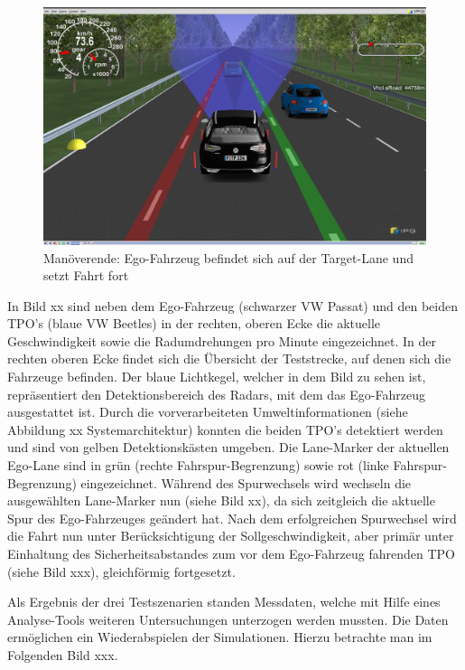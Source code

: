\begin{figure}[!ht]
	\begin{center}
		\includegraphics[width=1.0\linewidth]{Abbildungen/bericht/carmaker_lc_part3}
		\caption{Manöverende: Ego-Fahrzeug befindet sich auf der Target-Lane und setzt Fahrt fort}
		\label{fig.carmaker_lanechange_part3}
	\end{center}
\end{figure} 

In Bild xx sind neben dem Ego-Fahrzeug (schwarzer VW Passat) und den beiden TPO's (blaue VW Beetles) in der rechten, oberen Ecke die aktuelle Geschwindigkeit sowie die Radumdrehungen pro Minute eingezeichnet. In der rechten oberen Ecke findet sich die Übersicht der Teststrecke, auf denen sich die Fahrzeuge befinden. Der blaue Lichtkegel, welcher in dem Bild zu sehen ist, repräsentiert den Detektionsbereich des Radars, mit dem das Ego-Fahrzeug ausgestattet ist. Durch die vorverarbeiteten Umweltinformationen (siehe Abbildung xx Systemarchitektur) konnten die beiden TPO's detektiert werden und sind von gelben Detektionskästen umgeben. Die Lane-Marker der aktuellen Ego-Lane sind in grün (rechte Fahrspur-Begrenzung) sowie rot (linke Fahrspur-Begrenzung) eingezeichnet. Während des Spurwechsels wird wechseln die ausgewählten Lane-Marker nun (siehe Bild xx), da sich zeitgleich die aktuelle Spur des Ego-Fahrzeuges geändert hat. Nach dem erfolgreichen Spurwechsel wird die Fahrt nun unter Berücksichtigung der Sollgeschwindigkeit, aber primär unter Einhaltung des Sicherheitsabstandes zum vor dem Ego-Fahrzeug fahrenden TPO (siehe Bild xxx), gleichförmig fortgesetzt.

Als Ergebnis der drei Testszenarien standen Messdaten, welche mit Hilfe eines Analyse-Tools weiteren Untersuchungen unterzogen werden mussten. Die Daten ermöglichen ein \glqq Wiederabspielen\grqq{} der Simulationen. Hierzu betrachte man im Folgenden Bild xxx. 

